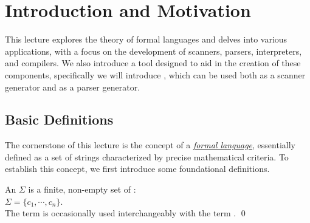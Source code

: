 \chapter{Introduction and Motivation}
This lecture explores the theory of formal languages and delves into various applications, with a focus on the
development of scanners, parsers, interpreters, and compilers. We also introduce a tool designed to aid in the
creation of these components, specifically we will introduce
, which can be used both as a scanner generator and as a parser generator.

\section{Basic Definitions}
The cornerstone of this lecture is the concept of a \href{http://en.wikipedia.org/wiki/Formal_language}{\emph{formal language}},  essentially defined as a set of strings characterized by precise mathematical criteria. To establish this concept, we first introduce some foundational definitions.

\begin{Definition}[Alphabet]
An  \( \Sigma \)  is a finite, non-empty set of :
\\[0.2cm]
\hspace*{1.3cm}
\( \Sigma = \{ c_1, \cdots, c_n \} \).
\\[0.2cm]
The term   is occasionally used interchangeably with the term .
\qed
\end{Definition}

